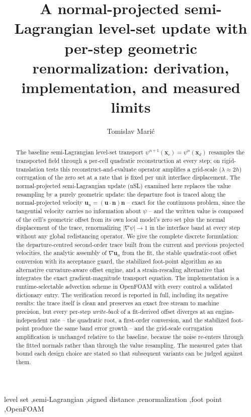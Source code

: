 \documentclass[preprint,3p,11pt]{elsarticle}
\newcommand{\psilev}{\psi}
\newcommand{\xc}{\mathbf{x}_c}
\newcommand{\xd}{\mathbf{x}_d}
\newcommand{\uvec}{\mathbf{u}}
\newcommand{\un}{\mathbf{u}_n}
\newcommand{\nv}{\mathbf{n}}
\newcommand{\gradpsi}{\lvert\nabla\psilev\rvert}
\begin{document}
\begin{frontmatter}

\title{A normal-projected semi-Lagrangian level-set update with per-step
geometric renormalization: derivation, implementation, and measured limits}

\author[tud,fe]{Tomislav Mari\'c}
\address[tud]{Mathematical Modeling and Analysis, Technische Universit\"at
Darmstadt, Germany}
\address[fe]{Focused Energy, Darmstadt, Germany}

\begin{abstract}
The baseline semi-Lagrangian level-set transport
$\psilev^{n+1}(\xc)=\psilev^{n}(\xd)$ resamples the transported field through a
per-cell quadratic reconstruction at every step; on rigid-translation tests this
reconstruct-and-evaluate operator amplifies a grid-scale ($\lambda\approx 2h$)
corrugation of the zero set at a rate that is fixed per unit interface
displacement. The normal-projected semi-Lagrangian update (nSL) examined here
replaces the value resampling by a purely geometric update: the departure foot
is traced along the normal-projected velocity $\un=(\uvec\cdot\nv)\nv$ -- exact
for the continuous problem, since the tangential velocity carries no information
about $\psilev$ -- and the written value is composed of the cell's geometric
offset from its own local model's zero set plus the normal displacement of the
trace, renormalizing $\gradpsi\to1$ in the interface band at every step without
any global redistancing operator. We give the complete discrete formulation:
the departure-centred second-order trace built from the current and previous
projected velocities, the analytic assembly of $\nabla\un$ from the fit, the
stable quadratic-root offset conversion with its acceptance guard, the
stabilized foot-point algorithm as an alternative curvature-aware offset
engine, and a strain-rescaling alternative that integrates the exact
gradient-magnitude transport equation. The implementation is a
runtime-selectable advection scheme in OpenFOAM with every control a validated
dictionary entry. The verification record is reported in full, including its
negative results: the trace itself is clean and preserves an exact free stream
to machine precision, but every per-step \emph{write-back} of a fit-derived
offset diverges at an engine-independent rate -- the quadratic root, a
first-order conversion, and the stabilized foot-point produce the same band
error growth -- and the grid-scale corrugation amplification is unchanged
relative to the baseline, because the noise re-enters through the fitted
normals rather than through the value resampling. The measured gates that
bound each design choice are stated so that subsequent variants can be judged
against them.
\end{abstract}

\begin{keyword}
level set \sep semi-Lagrangian \sep signed distance \sep renormalization
\sep foot point \sep OpenFOAM
\end{keyword}
\end{frontmatter}
\end{document}
